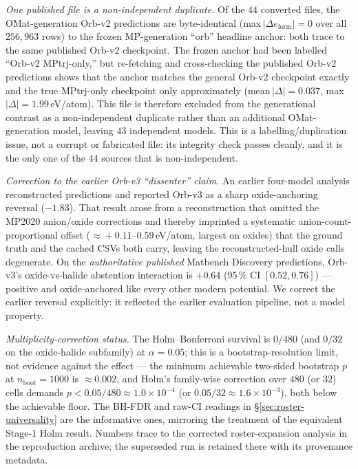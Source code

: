 \documentclass[aip,jcp,preprint,superscriptaddress,amsmath,amssymb]{revtex4-2}
\begin{document}
\emph{One published file is a non-independent duplicate.} Of the $44$ converted files, the
OMat-generation Orb-v2 predictions are byte-identical
(max\,$|\Delta e_{\mathrm{form}}| = 0$ over all $256{,}963$ rows) to the frozen
\textsc{MP}-generation ``orb'' headline anchor: both trace to the same published Orb-v2
checkpoint. The frozen anchor had been labelled ``Orb-v2 MPtrj-only,'' but re-fetching and
cross-checking the published Orb-v2 predictions shows that the anchor matches the general Orb-v2
checkpoint exactly and the true MPtrj-only checkpoint only approximately
(mean\,$|\Delta| = 0.037$, max\,$|\Delta| = 1.99$\,eV/atom). This file is therefore excluded from the
generational contrast as a non-independent duplicate rather than an additional OMat-generation
model, leaving $43$ independent models. This is a labelling/duplication issue, not a corrupt or
fabricated file: its integrity check passes cleanly, and it is the only one of the $44$ sources that is
non-independent.

\emph{Correction to the earlier Orb-v3 ``dissenter'' claim.} An earlier four-model analysis
reconstructed predictions and reported Orb-v3 as a sharp oxide-anchoring
reversal ($-1.83$). That result arose from a reconstruction that omitted
the MP2020 anion/oxide corrections and thereby imprinted a systematic anion-count-proportional
offset ($\approx\!+0.11$--$0.59$\,eV/atom, largest on oxides) that the ground truth and the cached
CSVs both carry, leaving the reconstructed-hull oxide calls degenerate. On the \emph{authoritative
published} Matbench Discovery predictions, Orb-v3's oxide-vs-halide abstention interaction is $+0.64$
(95\,\% CI $[0.52, 0.76]$) --- positive and oxide-anchored like every other modern potential. We
correct the earlier reversal explicitly: it reflected the earlier evaluation pipeline, not a model property.


\emph{Multiplicity-correction status.} The Holm--Bonferroni survival is $0/480$ (and $0/32$ on the oxide-halide subfamily) at $\alpha = 0.05$; this is a bootstrap-resolution limit, not evidence against the effect --- the minimum achievable two-sided bootstrap $p$ at $n_{\mathrm{boot}} = 1000$ is $\approx 0.002$, and Holm's family-wise correction over $480$ (or $32$) cells demands $p < 0.05/480 \approx 1.0\times10^{-4}$ (or $0.05/32 \approx 1.6\times10^{-3}$), both below the achievable floor. The BH-FDR and raw-CI readings in \S\ref{sec:roster-universality} are the informative ones, mirroring the treatment of the equivalent Stage-1 Holm result. Numbers trace to the corrected roster-expansion analysis in the reproduction archive; the superseded run is retained there with its provenance metadata.
\end{document}
